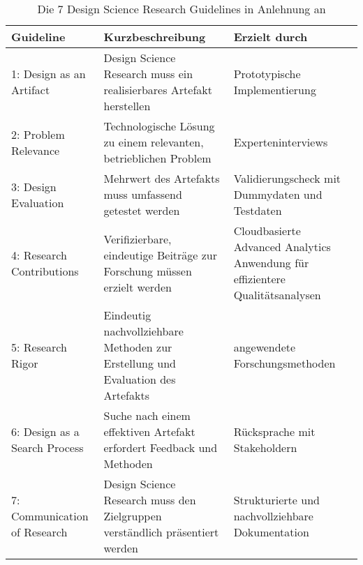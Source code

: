\begin{longtable}{p{}p{}p{}}
\caption{Die 7 Design Science Research Guidelines in Anlehnung an \cite{Hevneretal2004}}
\label{tab:DSResearchGuidelines}
\toprule
\textbf{Guideline} & \textbf{Kurzbeschreibung} & \textbf{Erzielt durch} \\*
\midrule
1: Design as an Artifact & Design Science Research muss ein realisierbares Artefakt herstellen & Prototypische Implementierung  \\*
\midrule
2: Problem Relevance & Technologische Lösung zu einem relevanten, betrieblichen Problem & Experteninterviews \\*
\midrule
3: Design Evaluation & Mehrwert des Artefakts muss umfassend getestet werden & Validierungscheck mit
Dummydaten und Testdaten  \\*
\midrule
4: Research Contributions & Verifizierbare, eindeutige Beiträge zur Forschung müssen erzielt werden & Cloudbasierte Advanced Analytics Anwendung für effizientere Qualitätsanalysen \\*
\midrule
5: Research Rigor & Eindeutig nachvollziehbare Methoden zur
Erstellung und Evaluation des Artefakts & angewendete Forschungsmethoden  \\*
\midrule
6: Design as a Search Process & Suche nach einem effektiven Artefakt
erfordert Feedback und Methoden & Rücksprache mit Stakeholdern \\*
\midrule
7: Communication of Research & Design Science Research muss den Zielgruppen verständlich präsentiert werden &
Strukturierte und nachvollziehbare Dokumentation \\*
\bottomrule
\end{longtable}
